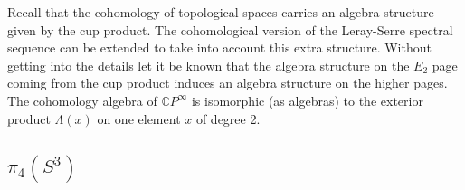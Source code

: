 Recall that the cohomology of topological spaces carries an algebra structure given by the cup product. The cohomological version of the Leray-Serre spectral sequence can be extended to take into account this extra structure. Without getting into the details let it be known that the algebra structure on the $E_2$ page coming from the cup product induces an algebra structure on the higher pages. The cohomology algebra of $\mathbb CP^\infty$ is isomorphic (as algebras) to the exterior product $\Lambda(x)$ on one element $x$ of degree 2. 

\unfinished






\subsection{$\pi_4(S^3)$}








